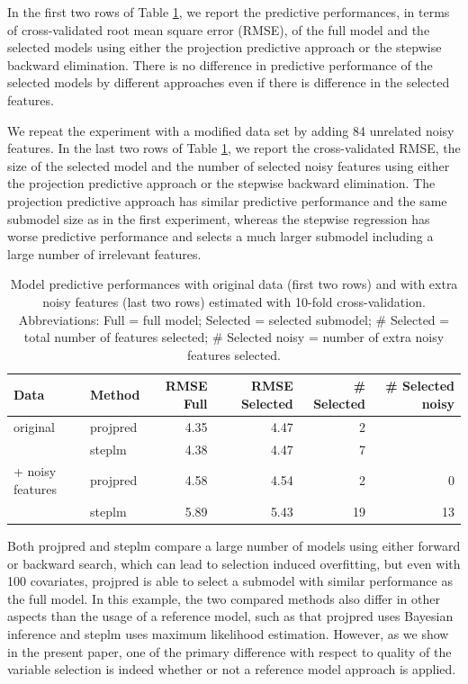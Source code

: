 \documentclass[american,]{article}
\theoremstyle{definition}
\begin{document}
In the first two rows of Table \ref{tab:model_performances}, we report the
predictive performances, in terms of cross-validated root mean square
error (RMSE), of the full model and the selected models using either
the projection predictive approach or the stepwise backward
elimination.  There is no difference in predictive performance of the
selected models by different approaches even if there is difference in
the selected features.

We repeat the experiment with a modified data set by adding 84
unrelated noisy features. In the last two rows of Table
\ref{tab:model_performances}, we report the cross-validated RMSE, the size of
the selected model and the number of selected noisy features using
either the projection predictive approach or the stepwise backward
elimination.  The projection predictive approach has similar
predictive performance and the same submodel size as in the first
experiment, whereas the stepwise regression has worse predictive
performance and selects a much larger submodel including a large
number of irrelevant features.

\begin{table}[tp]
\scriptsize
\centering
\begin{tabular}{ll|rrrr}
Data  & Method & RMSE Full & RMSE Selected & \# Selected & \# Selected noisy \\ 
  \hline
original & projpred & 4.35 & 4.47 & 2 &   \\
& steplm & 4.38 & 4.47 & 7 &  \\
\hline
+ noisy features & projpred & 4.58 & 4.54 & 2 & 0  \\
& steplm & 5.89 & 5.43 & 19 & 13 \\
\end{tabular}
\caption{Model predictive performances with original data (first two
  rows) and with extra noisy features (last two rows) estimated with
  10-fold cross-validation. Abbreviations: Full = full model; Selected =
  selected submodel; \# Selected = total number of features selected;
  \# Selected noisy = number of extra noisy features selected.}
\label{tab:model_performances}
\end{table}

Both projpred and steplm compare a large number of models using either
forward or backward search, which can lead to selection induced
overfitting, but even with 100 covariates, projpred is able to select a
submodel with similar performance as the full model. In this example, the two
 compared methods also differ in other aspects than the usage of a reference 
 model, such as that projpred
uses Bayesian inference and steplm uses maximum likelihood estimation. 
However, as we show in the present paper, one of the primary difference 
with respect to quality of the variable selection is indeed whether or 
not a reference model approach is applied.
\end{document}
